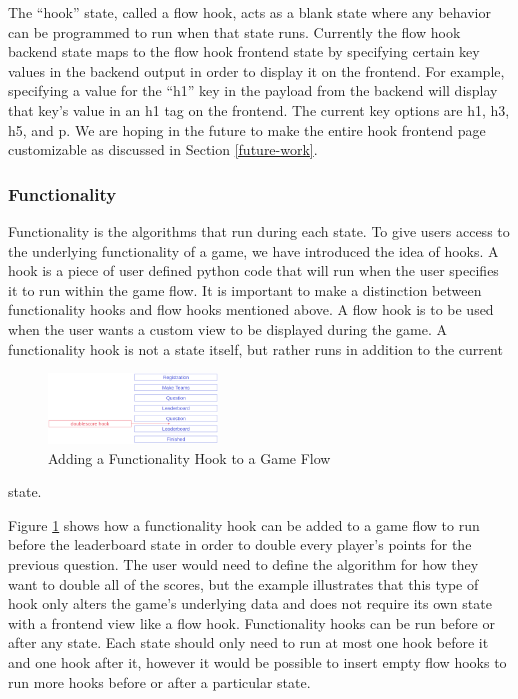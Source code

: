 \documentclass{article}
\begin{document}
            The ``hook'' state, called a flow hook, acts as a blank state where any behavior can be programmed to run when that state runs. Currently the flow hook backend state maps to the flow hook frontend state by specifying certain key values in the backend output in order to display it on the frontend. For example, specifying a value for the ``h1'' key in the payload from the backend will display that key's value in an h1 tag on the frontend. The current key options are h1, h3, h5, and p. We are hoping in the future to make the entire hook frontend page customizable as discussed in Section \ref{future-work}.
        
        \subsubsection{Functionality}\label{functionality}
            Functionality is the algorithms that run during each state. To give users access to the underlying functionality of a game, we have introduced the idea of hooks. A hook is a piece of user defined python code that will run when the user specifies it to run within the game flow. It is important to make a distinction between functionality hooks and flow hooks mentioned above. A flow hook is to be used when the user wants a custom view to be displayed during the game. A functionality hook is not a state itself, but rather runs in addition to the current
            \begin{figure}
                \centering
                \includegraphics[width=0.40\textwidth]{images/architecture-hook.png}
                \caption{Adding a Functionality Hook to a Game Flow}
                \label{fig:functionality-hook}
            \end{figure}
            state.
            
            Figure \ref{fig:functionality-hook} shows how a functionality hook can be added to a game flow to run before the leaderboard state in order to double every player's points for the previous question. The user would need to define the algorithm for how they want to double all of the scores, but the example illustrates that this type of hook only alters the game's underlying data and does not require its own state with a frontend view like a flow hook. Functionality hooks can be run before or after any state. Each state should only need to run at most one hook before it and one hook after it, however it would be possible to insert empty flow hooks to run more hooks before or after a particular state.
\end{document}
